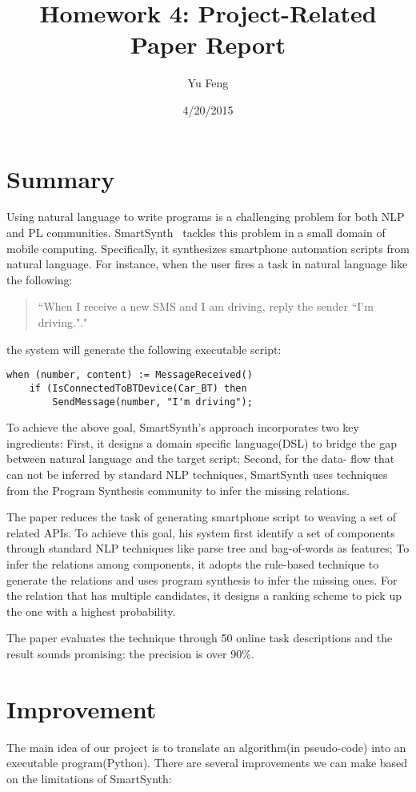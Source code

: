 \documentclass[10pt]{article}
\title{Homework 4: Project-Related Paper Report}
\author{Yu Feng}
\date{4/20/2015}
\begin{document}
\maketitle

\section{Summary}\label{sec:intro}
Using natural language to write programs is a challenging problem for both NLP 
and PL communities. SmartSynth~\cite{smart} tackles this problem in a small domain of mobile computing. Specifically, it synthesizes smartphone automation scripts from natural language. For instance, when the user fires a task in natural language 
like the following:
\begin{quotation}
``When I receive a new SMS and I am driving, reply the sender ``I'm driving."."
\end{quotation}
the system will generate the following executable script:
\small\begin{verbatim}
when (number, content) := MessageReceived()
    if (IsConnectedToBTDevice(Car_BT) then
        SendMessage(number, "I'm driving");
\end{verbatim}
To achieve the above goal, SmartSynth's approach incorporates two key ingredients: First, it designs
a domain specific language(DSL) to bridge the gap between natural language and the
target script; Second, for the data- flow that can not be inferred by 
standard NLP techniques, SmartSynth uses techniques from the Program Synthesis community to infer the missing relations.

The paper reduces the task of generating smartphone script to weaving a set of 
related APIs. To achieve this goal, his system first identify a set of components 
through standard NLP techniques like parse tree and bag-of-words as features; 
To infer the relations among components, it adopts the rule-based technique to 
generate the relations and uses program synthesis to infer the missing ones. For
the relation that has multiple candidates, it designs a ranking scheme to pick up
the one with a highest probability.

The paper evaluates the technique through 50 online task descriptions and the result
sounds promising: the precision is over 90\%.


\section{Improvement}\label{sec:alg}
The main idea of our project is to translate an algorithm(in pseudo-code) into an 
executable program(Python). There are several improvements we can make based on the 
limitations of SmartSynth:
\end{document}
